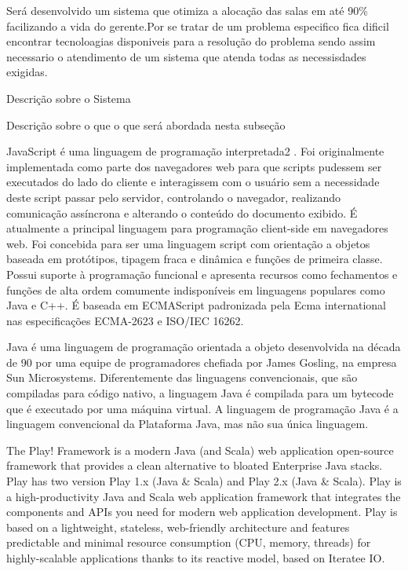 


Será desenvolvido um sistema que otimiza a alocação das salas em até 90\% facilizando a vida do gerente.Por se tratar de um problema especifico fica dificil encontrar tecnoloagias disponiveis para a resolução do problema sendo assim necessario o atendimento de um sistema que atenda todas as necessisdades exigidas.

	
	Descrição sobre o Sistema


	Descrição sobre o que o que será abordada nesta subseção


	JavaScript é uma linguagem de programação interpretada2 . Foi originalmente implementada como parte dos navegadores web para que scripts pudessem ser executados do lado do cliente e interagissem com o usuário sem a necessidade deste script passar pelo servidor, controlando o navegador, realizando comunicação assíncrona e alterando o conteúdo do documento exibido.
	É atualmente a principal linguagem para programação client-side em navegadores web. Foi concebida para ser uma linguagem script com orientação a objetos baseada em protótipos, tipagem fraca e dinâmica e funções de primeira classe. Possui suporte à programação funcional e apresenta recursos como fechamentos e funções de alta ordem comumente indisponíveis em linguagens populares como Java e C++.
	É baseada em ECMAScript padronizada pela Ecma international nas especificações ECMA-2623 e ISO/IEC 16262.\cite{alterar}

	Java é uma linguagem de programação orientada a objeto desenvolvida na década de 90 por uma equipe de programadores chefiada por James Gosling, na empresa Sun Microsystems. Diferentemente das linguagens convencionais, que são compiladas para código nativo, a linguagem Java é compilada para um bytecode que é executado por uma máquina virtual. A linguagem de programação Java é a linguagem convencional da Plataforma Java, mas não sua única linguagem.\cite{alterar}


	The Play! Framework is a modern Java (and Scala) web application open-source framework that provides a clean alternative to bloated Enterprise Java stacks. Play has two version Play 1.x (Java & Scala) and Play 2.x (Java & Scala).
	Play is a high-productivity Java and Scala web application framework that integrates the components and APIs you need for modern web application development.
	Play is based on a lightweight, stateless, web-friendly architecture and features predictable and minimal resource consumption (CPU, memory, threads) for highly-scalable applications thanks to its reactive model, based on Iteratee IO.\par\cite{alterar}

